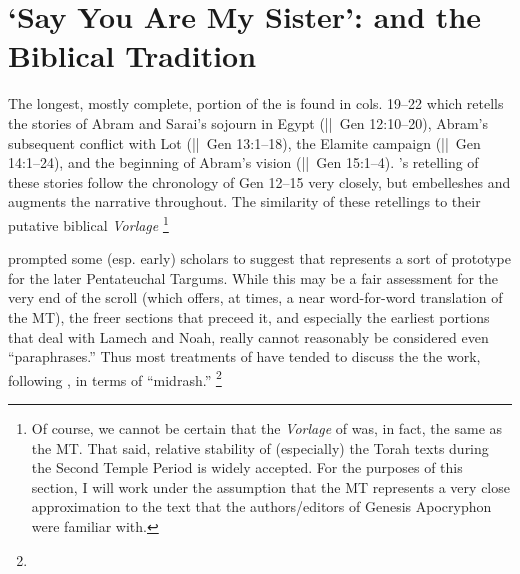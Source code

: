\section{`Say You Are My Sister': \ga and the Biblical Tradition}

The longest, mostly complete, portion of the \ga is found in cols. 19--22 which retells the stories of Abram and Sarai's sojourn in Egypt (||~Gen 12:10--20), Abram's subsequent conflict with Lot (||~Gen 13:1--18), the Elamite campaign (||~Gen 14:1--24), and the beginning of Abram's vision (||~Gen 15:1--4). \ga's retelling of these stories follow the chronology of Gen 12--15 very closely, but \ga embelleshes and augments the narrative throughout. The similarity of these retellings to their putative biblical \emph{Vorlage}%
%
\footnote{Of course, we cannot be certain that the \emph{Vorlage} of \ga was, in fact, the same as the MT. That said, relative stability of (especially) the Torah texts during the Second Temple Period is widely accepted. For the purposes of this section, I will work under the assumption that the MT represents a very close approximation to the text that the authors/editors of Genesis Apocryphon were familiar with.}

prompted some (esp. early) scholars to suggest that \ga represents a sort of prototype for the later Pentateuchal Targums.\autocite[193]{black1983} While this may be a fair assessment for the very end of the scroll (which offers, at times, a near word-for-word translation of the MT), the freer sections that preceed it, and especially the earliest portions that deal with Lamech and Noah, really cannot reasonably be considered even ``paraphrases.'' Thus most treatments of \ga have tended to discuss the the work, following \vermes, in terms of ``midrash.''%
%
\footnote{}





